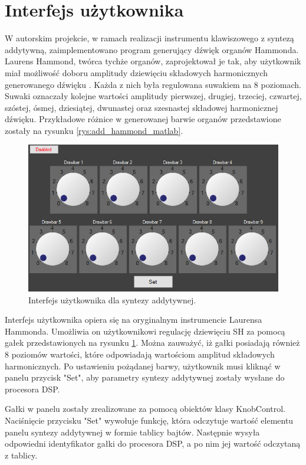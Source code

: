 \section{Interfejs użytkownika}
W autorskim projekcie, w ramach realizacji instrumentu klawiszowego z syntezą addytywną, zaimplementowano program generujący dźwięk organów Hammonda. 
Laurens Hammond, twórca tychże organów, zaprojektował je tak, aby użytkownik miał możliwość doboru amplitudy dziewięciu składowych harmonicznych generowanego dźwięku \cite{add_hammond_soundonsound}. Każda z nich była regulowana suwakiem na 8 poziomach. Suwaki oznaczały kolejne wartości amplitudy pierwszej, drugiej, trzeciej, czwartej, szóstej, ósmej, dziesiątej, dwunastej oraz szesnastej składowej harmonicznej dźwięku. Przykładowe różnice w generowanej barwie organów przedstawione zostały na rysunku \ref{rys:add_hammond_matlab}.
\begin{figure}[H]
	\centering
	\includegraphics[width=15cm]{grafiki/add_interface}
	\captionsetup{justification=centering}
	\caption{Interfejs użytkownika dla syntezy addytywnej.}
	\label{rys:add_interface}
\end{figure}

Interfejs użytkownika opiera się na oryginalnym instrumencie Laurensa Hammonda. Umożliwia on użytkownikowi regulację dziewięciu SH za pomocą gałek przedstawionych na rysunku \ref{rys:add_interface}. Można zauważyć, iż gałki posiadają również 8 poziomów wartości, które odpowiadają wartościom amplitud składowych harmonicznych. Po ustawieniu pożądanej barwy, użytkownik musi kliknąć w panelu przycisk "Set", aby parametry syntezy addytywnej zostały wysłane do procesora DSP.

Gałki w panelu zostały zrealizowane za pomocą obiektów klasy KnobControl. Naciśnięcie przycisku "Set" wywołuje funkcję, która odczytuje wartość elementu panelu syntezy addytywnej w formie tablicy bajtów. Następnie wysyła odpowiedni identyfikator gałki do procesora DSP, a po nim jej wartość odczytaną z tablicy.

